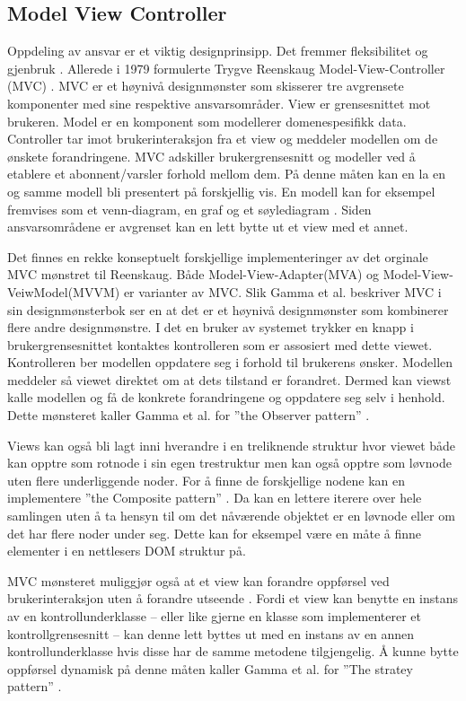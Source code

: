 \documentclass[norsk]{article}
\begin{document}
\subsection{Model View Controller}
Oppdeling av ansvar er et viktig designprinsipp. Det fremmer fleksibilitet og gjenbruk \parencite[s. 14]{gamma}. Allerede i 1979 formulerte Trygve Reenskaug Model-View-Controller (MVC) \parencite{wikiReen}. MVC er et høynivå designmønster som skisserer tre avgrensete komponenter med sine respektive ansvarsområder. View er grensesnittet mot brukeren. Model er en komponent som modellerer domenespesifikk data. Controller tar imot brukerinteraksjon fra et view og meddeler modellen om de ønskete forandringene. MVC adskiller brukergrensesnitt og modeller ved å etablere et abonnent/varsler forhold mellom dem. På denne måten kan en la en og samme modell bli presentert på forskjellig vis. En modell kan for eksempel fremvises som et venn-diagram, en graf og et søylediagram \parencite[s. 14-15]{gamma}. Siden ansvarsområdene er avgrenset kan en lett bytte ut et view med et annet. 

Det finnes en rekke konseptuelt forskjellige implementeringer av det orginale MVC mønstret til Reenskaug. Både Model-View-Adapter(MVA) og Model-View-VeiwModel(MVVM) er varianter av MVC. Slik Gamma et al. beskriver MVC i sin designmønsterbok ser en at det er et høynivå designmønster som kombinerer flere andre designmønstre. I det en bruker av systemet trykker en knapp i brukergrensesnittet kontaktes kontrolleren som er assosiert med dette viewet. Kontrolleren ber modellen oppdatere seg i forhold til brukerens ønsker. Modellen meddeler så viewet direktet om at dets tilstand er forandret. Dermed kan viewst kalle modellen og få de konkrete forandringene og oppdatere seg selv i henhold. Dette mønsteret kaller Gamma et al. for ”the Observer pattern” \parencite[s. 15]{gamma}. 

Views kan også bli lagt inni hverandre i en treliknende struktur hvor viewet både kan opptre som rotnode i sin egen trestruktur men kan også opptre som løvnode uten flere underliggende noder. For å finne de forskjellige nodene kan en implementere ”the Composite pattern” \parencite[s. 530-532]{freeman}. Da kan en lettere iterere over hele samlingen uten å ta hensyn til om det nåværende objektet er en løvnode eller om det har flere noder under seg. Dette kan for eksempel være en måte å finne elementer i en nettlesers DOM struktur på.

MVC mønsteret muliggjør også at et view kan forandre oppførsel ved brukerinteraksjon uten å forandre utseende \parencite[s. 16]{gamma}. Fordi et view kan benytte en instans av en kontrollunderklasse -- eller like gjerne en klasse som implementerer et kontrollgrensesnitt -- kan denne lett byttes ut med en instans av en annen kontrollunderklasse hvis disse har de samme metodene tilgjengelig. Å kunne bytte oppførsel dynamisk på denne måten kaller Gamma et al. for ”The stratey pattern” \parencite[s. 532]{freeman}.
\end{document}
